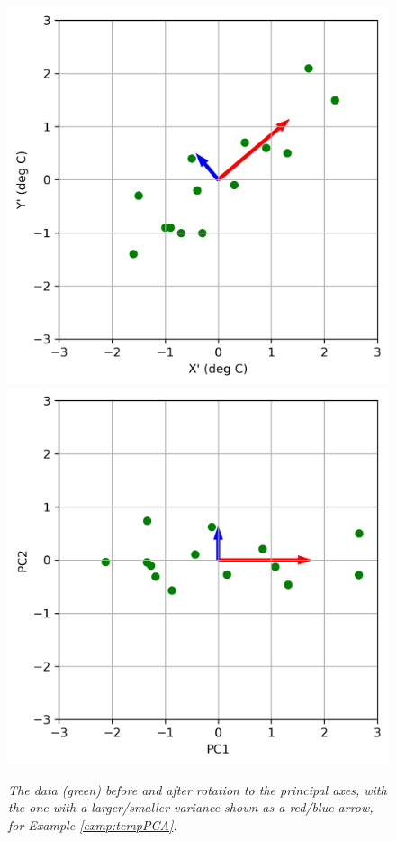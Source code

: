 \begin{figure}[h!]
\centering
\includegraphics[scale = 0.65]{graphics/PCA_exmp_1.png}\\
\includegraphics[scale = 0.65]{graphics/PCA_exmp_2.png}
\caption{\textit{The data (green) before and after rotation to the principal axes, with the one with a larger/smaller variance shown as a red/blue arrow, for Example \ref{exmp:tempPCA}.}}
\end{figure}
